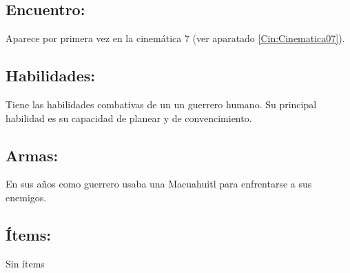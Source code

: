 \subsection{Encuentro:}
Aparece por primera vez en la cinemática 7 (ver aparatado \ref{Cin:Cinematica07}).
\subsection{Habilidades:}
Tiene las habilidades combativas de un un guerrero humano. Su principal habilidad es su capacidad de planear y de convencimiento.
\subsection{Armas:}
En sus años como guerrero usaba una Macuahuitl para enfrentarse a sus enemigos.
\subsection{Ítems:}
Sin ítems
